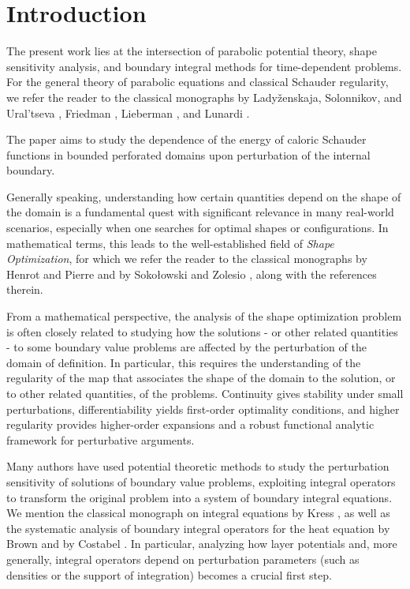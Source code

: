 \documentclass[11pt,reqno,a4paper]{amsart}
\theoremstyle{plain}
\theoremstyle{definition}
\begin{document}
\tableofcontents

\section{Introduction} 
The present work lies at the intersection of parabolic potential theory, shape sensitivity analysis, and boundary integral methods for time-dependent problems. For the general theory of parabolic equations and classical Schauder regularity, we refer the reader to the classical monographs by Lady\v{z}enskaja, Solonnikov, and Ural'tseva \cite{LaSoUr68}, Friedman \cite{Friedman2008}, Lieberman \cite{Li96}, and Lunardi \cite{Lu95}.

The paper aims to study the dependence of the energy of caloric Schauder functions in bounded perforated domains upon perturbation of the internal boundary. 

Generally speaking, understanding how certain quantities depend on the shape of the domain is a fundamental quest with significant relevance in many real-world scenarios, especially when one searches for optimal shapes or configurations. In mathematical terms, this leads to the well-established field of \textit{Shape Optimization}, for which we refer the reader to the classical monographs by Henrot and Pierre \cite{HePi18} and by Soko{\l}owski and Zolesio \cite{SoZo92}, along with the references therein.

From a mathematical perspective, the analysis of the shape optimization problem is often closely related to studying how the solutions - or other related quantities - to some boundary value problems are affected by the perturbation of the domain of definition. In particular, this requires the understanding of the regularity of the map that associates the shape of the domain to the solution, or to other related quantities, of the problems.
Continuity gives stability under small perturbations, differentiability yields first-order optimality conditions, and higher regularity provides higher-order expansions and a robust functional analytic framework for perturbative arguments.

Many authors have used potential theoretic methods to study the perturbation sensitivity of solutions of boundary value problems, exploiting integral operators to transform the original problem into a system of boundary integral equations. We mention the classical monograph on integral equations by Kress \cite{Kr14}, as well as the systematic analysis of boundary integral operators for the heat equation by Brown \cite{Br89,Br90} and by Costabel \cite{Co90,Co04}. In particular, analyzing how layer potentials and, more generally, integral operators depend on perturbation parameters (such as densities or the support of integration) becomes a crucial first step.
\end{document}

